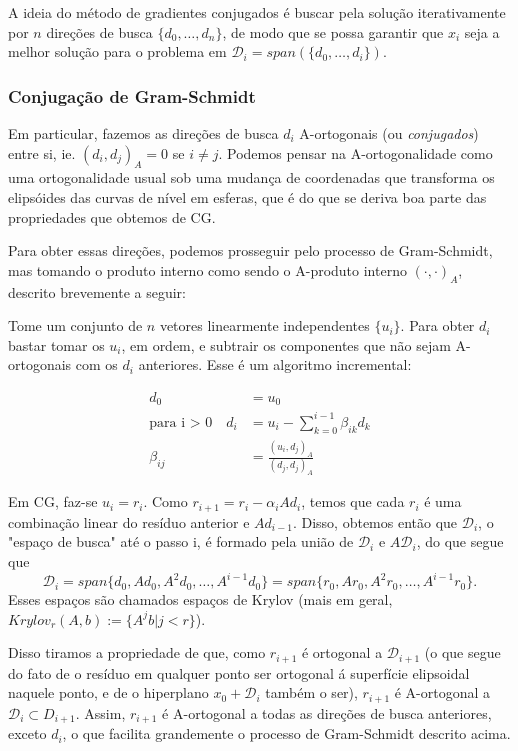 \documentclass[11pt]{article}
\begin{document}
A ideia do método de gradientes conjugados é buscar pela solução
iterativamente por \(n\) direções de busca \(\{d_0, \ldots, d_n\}\), de
modo que se possa garantir que \(x_i\) seja a melhor solução para o
problema em \(\mathcal D_i = span(\{d_0, \ldots, d_i\})\).

\subsubsection{Conjugação de
Gram-Schmidt}\label{conjugauxe7uxe3o-de-gram-schmidt}

Em particular, fazemos as direções de busca \(d_i\) A-ortogonais (ou
\emph{conjugados}) entre si, ie. \((d_i,d_j)_A = 0\) se \(i \neq j\).
Podemos pensar na A-ortogonalidade como uma ortogonalidade usual sob uma
mudança de coordenadas que transforma os elipsóides das curvas de nível
em esferas, que é do que se deriva boa parte das propriedades que
obtemos de CG.

Para obter essas direções, podemos prosseguir pelo processo de
Gram-Schmidt, mas tomando o produto interno como sendo o A-produto
interno \((\cdot,\cdot)_A\), descrito brevemente a seguir:

Tome um conjunto de \(n\) vetores linearmente independentes \(\{u_i\}\).
Para obter \(d_i\) bastar tomar os \(u_i\), em ordem, e subtrair os
componentes que não sejam A-ortogonais com os \(d_i\) anteriores. Esse é
um algoritmo incremental:

\[
\begin{split}
    d_0 &= u_0 \\
    \text{para i > 0} \quad d_i &= u_i - \sum_{k=0}^{i-1}\beta_{ik}d_k \\
    \beta_{ij} &= \frac{(u_i, d_j)_A}{(d_j,d_j)_A}
\end{split}
\]

    Em CG, faz-se \(u_i = r_i\). Como \(r_{i+1} = r_i - \alpha_i Ad_i\),
temos que cada \(r_i\) é uma combinação linear do resíduo anterior e
\(Ad_{i-1}\). Disso, obtemos então que \(\mathcal D_i\), o "espaço de
busca" até o passo i, é formado pela união de \(\mathcal D_i\) e
\(A \mathcal D_i\), do que segue que
\[\mathcal D_i = span\{d_0, Ad_0, A^2d_0, \ldots, A^{i-1}d_0\} = span\{r_0, Ar_0, A^2r_0, \ldots, A^{i-1}r_0\}. \]
Esses espaços são chamados espaços de Krylov (mais em geral,
\(Krylov_r(A,b) := \{A^jb|j<r\}\)).

Disso tiramos a propriedade de que, como \(r_{i+1}\) é ortogonal a
\(\mathcal D_{i+1}\) (o que segue do fato de o resíduo em qualquer ponto
ser ortogonal á superfície elipsoidal naquele ponto, e de o hiperplano
\(x_0 + \mathcal D_i\) também o ser), \(r_{i+1}\) é A-ortogonal a
\(\mathcal D_i \subset D_{i+1}\). Assim, \(r_{i+1}\) é A-ortogonal a
todas as direções de busca anteriores, exceto \(d_i\), o que facilita
grandemente o processo de Gram-Schmidt descrito acima.
\end{document}
